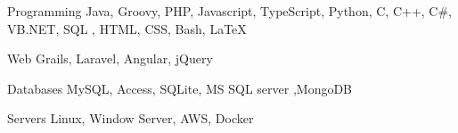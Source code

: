 
\begin{cvskills}

  \cvskill
    {Programming} %
    {Java, Groovy, PHP, Javascript, TypeScript, Python, C, C++, C\#, VB.NET, SQL , HTML, CSS, Bash, \LaTeX} %

  \cvskill
    {Web} %
    {Grails, Laravel, Angular, jQuery} %

  \cvskill
    {Databases} %
    {MySQL, Access, SQLite, MS SQL server ,MongoDB} %

  \cvskill
    {Servers} %
    {Linux, Window Server, AWS, Docker} %


\end{cvskills}